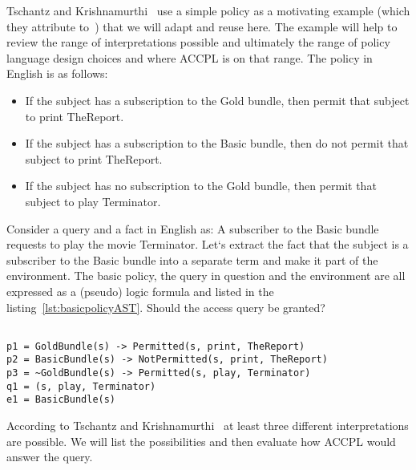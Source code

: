 Tschantz and Krishnamurthi~\cite{Tschantz} use a simple policy as a motivating example (which they attribute to~\cite{Halpern2008}) that we will adapt and reuse here. The example will help to review the range of interpretations possible and ultimately the range of policy language design choices and where \ac{ACCPL} is on that range.
The policy in English is as follows:

\begin{itemize}
\item If the subject has a subscription to the Gold bundle, then permit that subject to print TheReport.

\item If the subject has a subscription to the Basic bundle, then do not permit that subject to print TheReport.

\item If the subject has no subscription to the Gold bundle, then permit that subject to play Terminator.
\end{itemize}

Consider a query and a fact in English as: A subscriber to the Basic bundle requests to play the movie Terminator. Let`s extract the fact that the subject is a subscriber to the Basic bundle into a separate term and make it part of the environment. The basic policy, the query in question and the environment are all expressed as a (pseudo) logic formula and listed in the listing~\ref{lst:basicpolicyAST}. Should the access query be granted?

\lstset{mathescape, language=AST}  
\begin{lstlisting}[frame=single, caption={Basic Policy},label={lst:basicpolicyAST}]

p1 = GoldBundle(s) -> Permitted(s, print, TheReport) 
p2 = BasicBundle(s) -> NotPermitted(s, print, TheReport) 
p3 = ~GoldBundle(s) -> Permitted(s, play, Terminator)
q1 = (s, play, Terminator) 
e1 = BasicBundle(s)
\end{lstlisting}


According to Tschantz and Krishnamurthi~\cite{Tschantz} at least three different interpretations are possible. We will list the possibilities and then evaluate how \ac{ACCPL} would answer the query.

